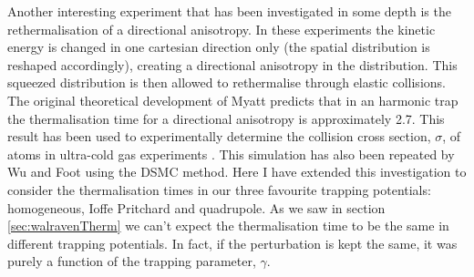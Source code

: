 Another interesting experiment that has been investigated in some depth is the rethermalisation of a directional anisotropy. 
In these experiments the kinetic energy is changed in one cartesian direction only (the spatial distribution is reshaped accordingly), creating a directional anisotropy in the distribution.
This squeezed distribution is then allowed to rethermalise through elastic collisions.
The original theoretical development of Myatt \cite{Myatt1997} predicts that in an harmonic trap the thermalisation time for a directional anisotropy is approximately 2.7.
This result has been used to experimentally determine the collision cross section, $\sigma$, of atoms in ultra-cold gas experiments \cite{Monroe1993, Davis1995}. 
This simulation has also been repeated by Wu and Foot \cite{Wu1996} using the DSMC method.
Here I have extended this investigation to consider the thermalisation times in our three favourite trapping potentials: homogeneous, Ioffe Pritchard and quadrupole.
As we saw in section \ref{sec:walravenTherm} we can't expect the thermalisation time to be the same in different trapping potentials.
In fact, if the perturbation is kept the same, it was purely a function of the trapping parameter, $\gamma$.

